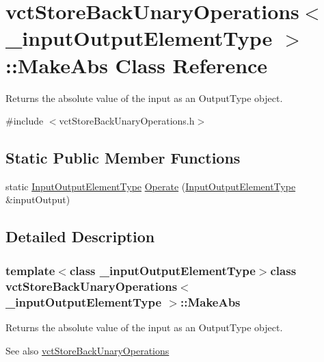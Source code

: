 \hypertarget{classvct_store_back_unary_operations_1_1_make_abs}{}\section{vct\+Store\+Back\+Unary\+Operations$<$ \+\_\+input\+Output\+Element\+Type $>$\+:\+:Make\+Abs Class Reference}
\label{classvct_store_back_unary_operations_1_1_make_abs}


Returns the absolute value of the input as an Output\+Type object.  




{\ttfamily \#include $<$vct\+Store\+Back\+Unary\+Operations.\+h$>$}

\subsection*{Static Public Member Functions}
\begin{DoxyCompactItemize}
\item 
static \hyperlink{classvct_store_back_unary_operations_a8af17faaa73a8d090094d468eee32062}{Input\+Output\+Element\+Type} \hyperlink{classvct_store_back_unary_operations_1_1_make_abs_afe23ed0cc7cc3dac5e2e8bd4623f39b3}{Operate} (\hyperlink{classvct_store_back_unary_operations_a8af17faaa73a8d090094d468eee32062}{Input\+Output\+Element\+Type} \&input\+Output)
\end{DoxyCompactItemize}


\subsection{Detailed Description}
\subsubsection*{template$<$class \+\_\+input\+Output\+Element\+Type$>$class vct\+Store\+Back\+Unary\+Operations$<$ \+\_\+input\+Output\+Element\+Type $>$\+::\+Make\+Abs}

Returns the absolute value of the input as an Output\+Type object. 

\begin{DoxySeeAlso}{See also}
\hyperlink{classvct_store_back_unary_operations}{vct\+Store\+Back\+Unary\+Operations} 
\end{DoxySeeAlso}


